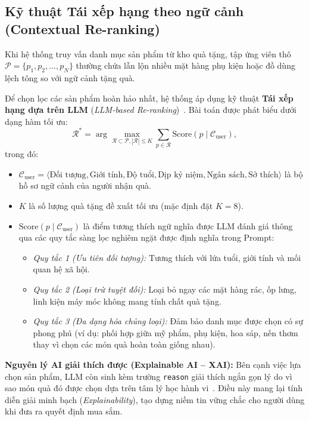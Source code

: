 \subsection{Kỹ thuật Tái xếp hạng theo ngữ cảnh (Contextual Re-ranking)}

Khi hệ thống truy vấn danh mục sản phẩm từ kho quà tặng, tập ứng viên thô $\mathcal{P} = \{p_1, p_2, \dots, p_N\}$ thường chứa lẫn lộn nhiều mặt hàng phụ kiện hoặc đồ dùng lệch tông so với ngữ cảnh tặng quà.

Để chọn lọc các sản phẩm hoàn hảo nhất, hệ thống áp dụng kỹ thuật \textbf{Tái xếp hạng dựa trên LLM} (\textit{LLM-based Re-ranking})~\cite{llm_reranking}. Bài toán được phát biểu dưới dạng hàm tối ưu:
\begin{equation}
\mathcal{R}^* = \arg\max_{\mathcal{R} \subset \mathcal{P}, |\mathcal{R}| \le K} \sum_{p \in \mathcal{R}} \mathrm{Score}(p \mid \mathcal{C}_{\mathrm{user}}),
\label{eq:rerank}
\end{equation}
trong đó:
\begin{itemize}[leftmargin=1.2cm, itemsep=2pt]
    \item $\mathcal{C}_{\mathrm{user}} = \langle \text{Đối tượng}, \text{Giới tính}, \text{Độ tuổi}, \text{Dịp kỷ niệm}, \text{Ngân sách}, \text{Sở thích} \rangle$ là bộ hồ sơ ngữ cảnh của người nhận quà.
    \item $K$ là số lượng quà tặng đề xuất tối ưu (mặc định đặt $K = 8$).
    \item $\mathrm{Score}(p \mid \mathcal{C}_{\mathrm{user}})$ là điểm tương thích ngữ nghĩa được LLM đánh giá thông qua các quy tắc sàng lọc nghiêm ngặt được định nghĩa trong Prompt:
    \begin{itemize}[leftmargin=0.6cm, itemsep=1pt]
        \item \textit{Quy tắc 1 (Ưu tiên đối tượng):} Tương thích với lứa tuổi, giới tính và mối quan hệ xã hội.
        \item \textit{Quy tắc 2 (Loại trừ tuyệt đối):} Loại bỏ ngay các mặt hàng rác, ốp lưng, linh kiện máy móc không mang tính chất quà tặng.
        \item \textit{Quy tắc 3 (Đa dạng hóa chủng loại):} Đảm bảo danh mục được chọn có sự phong phú (ví dụ: phối hợp giữa mỹ phẩm, phụ kiện, hoa sáp, nến thơm thay vì chọn các món quà hoàn toàn giống nhau).
    \end{itemize}
\end{itemize}

\begin{successbox}
\textbf{Nguyên lý AI giải thích được (Explainable AI -- XAI):}
Bên cạnh việc lựa chọn sản phẩm, LLM còn sinh kèm trường \texttt{reason} giải thích ngắn gọn lý do vì sao món quà đó được chọn dựa trên tâm lý học hành vi~\cite{gift_psychology}. Điều này mang lại tính diễn giải minh bạch (\textit{Explainability}), tạo dựng niềm tin vững chắc cho người dùng khi đưa ra quyết định mua sắm.
\end{successbox}

